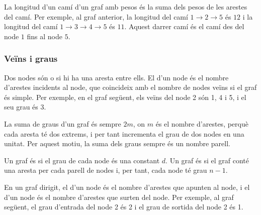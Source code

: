 La longitud d'un camí d'un graf amb pesos és la suma dels pesos de les
arestes del camí. Per exemple, al graf anterior, la longitud del camí
$1 \rightarrow 2 \rightarrow 5$ és $12$ i la longitud del camí $1
\rightarrow 3 \rightarrow 4 \rightarrow 5$ és $11$. Aquest darrer camí
és el camí  des del node $1$ fins al node $5$.

\subsubsection{Veïns i graus}

 

Dos nodes són  o  si hi ha una aresta entre
ells. El  d'un node és el nombre d'arestes incidents al
node, que coincideix amb el nombre de nodes veïns si el graf és
simple. Per exemple, en el graf següent, els veïns del node 2 són 1, 4 i
5, i el seu grau és 3.


\begin{center}
\end{center}


La suma de graus d'un graf és sempre $2m$, on $m$ és el nombre
d'arestes, perquè cada aresta té dos extrems, i per tant incrementa el
grau de dos nodes en una unitat. Per aquest motiu, la suma dels graus
sempre és un nombre parell.

 

Un graf és  si el grau de cada node és una constant
$d$. Un graf és  si el graf conté una aresta per cada parell
de nodes i, per tant, cada node té grau $n-1$.

 

En un graf dirigit, el  d'un node és el nombre d'arestes
que apunten al node, i el  d'un node és el nombre
d'arestes que surten del node. Per exemple, al graf següent, el grau
d'entrada del node 2 és 2 i el grau de sortida del node 2 és 1.


